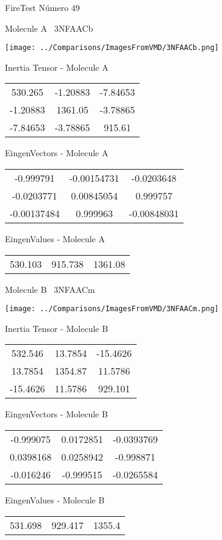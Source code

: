 \vtab[-3cm]
\begin{center}
{\large FireTest \tab Número 49}
\end{center}
\begin{multicols}{2}
\begin{center}

Molecule A \
3NFAACb

\texttt{[image: ../Comparisons/ImagesFromVMD/3NFAACb.png]}

Inertia Tensor - Molecule A \\
\begin{tabular}{|c c c|}
530.265	 & 	-1.20883	 & 	-7.84653	 \\
-1.20883	 & 	1361.05	 & 	-3.78865	 \\
-7.84653	 & 	-3.78865	 & 	915.61
\end{tabular}

\vtab
 EingenVectors - Molecule A     \\
\begin{tabular}{|c c c|}
-0.999791	 & 	-0.00154731	 & 	-0.0203648	 \\
-0.0203771	 & 	0.00845054	 & 	0.999757	 \\
-0.00137484	 & 	0.999963	 & 	-0.00848031
\end{tabular}

\vtab
 EingenValues - Molecule A     \\
\begin{tabular}{|c c c|}
530.103	 & 	915.738	 & 	1361.08	 \\
\end{tabular}
\columnbreak

Molecule B \
3NFAACm

\texttt{[image: ../Comparisons/ImagesFromVMD/3NFAACm.png]}

Inertia Tensor - Molecule B \\
\begin{tabular}{|c c c|}
532.546	 & 	13.7854	 & 	-15.4626	 \\
13.7854	 & 	1354.87	 & 	11.5786	 \\
-15.4626	 & 	11.5786	 & 	929.101
\end{tabular}

\vtab
 EingenVectors - Molecule B     \\
\begin{tabular}{|c c c|}
-0.999075	 & 	0.0172851	 & 	-0.0393769	 \\
0.0398168	 & 	0.0258942	 & 	-0.998871	 \\
-0.016246	 & 	-0.999515	 & 	-0.0265584
\end{tabular}

\vtab
 EingenValues - Molecule B     \\
\begin{tabular}{|c c c|}
531.698	 & 	929.417	 & 	1355.4	 \\
\end{tabular}

\end{center}
\end{multicols}

